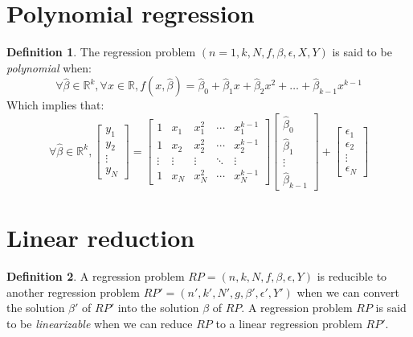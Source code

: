 \documentclass{article}
\theoremstyle{definition}
\newtheorem{definition}{Definition}[section]
\theoremstyle{remark}
\theoremstyle{example}
\newcommand{\betat}{\hat{\beta}}
\newcommand{\fvector}[2]{\begin{bmatrix} #1_1 \\ #1_2 \\ \vdots \\ #1_{#2} \end{bmatrix}}
\begin{document}
\section{Polynomial regression}

\begin{definition}
		The regression problem $(n=1, k, N, f, \beta, \epsilon, X, Y)$ is said to be \textit{polynomial} when:
				$$\forall \betat \in \mathbb{R}^k, \forall x \in \mathbb{R}, f(x, \betat) = \betat_0 + \betat_1 x + \betat_2 x^2 + \dots + \betat_{k-1} x^{k-1}$$
		Which implies that:
		$$\forall \betat \in \mathbb{R}^k, \fvector{y}{N} = \begin{bmatrix} 1 & x_1 & x_1^2 & \cdots & x_1^{k-1} \\ 1 & x_2 & x_2^2 & \cdots & x_2^{k-1} \\ \vdots & \vdots & \vdots & \ddots & \vdots \\ 1 & x_N & x_N^2 & \cdots & x_N^{k-1} \end{bmatrix} \begin{bmatrix} \betat_0 \\ \betat_1 \\ \vdots \\ \betat_{k-1} \end{bmatrix} + \fvector{\epsilon}{N}$$
\end{definition}





\section{Linear reduction}

\begin{definition}
		A regression problem $RP = (n, k, N, f, \beta, \epsilon, Y)$ is reducible to another regression problem $RP' = (n', k', N', g, \beta', \epsilon', Y')$ when we can convert the solution $\beta'$ of $RP'$ into the solution $\beta$ of $RP$. A regression problem $RP$ is said to be \textit{linearizable} when we can reduce $RP$ to a linear regression problem $RP'$. %
\end{definition}
\end{document}
